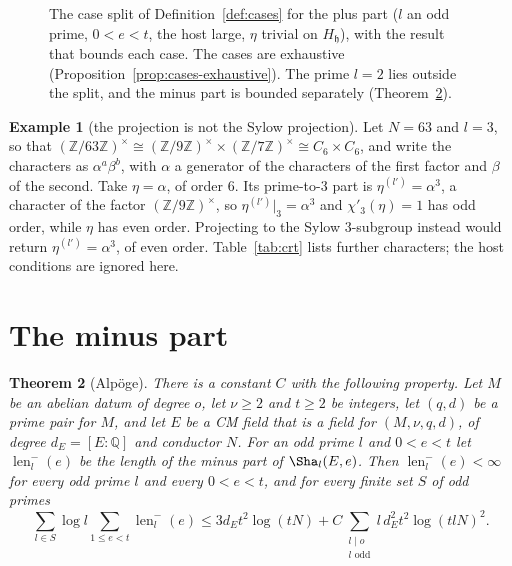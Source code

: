 \documentclass[11pt]{amsbook}
\theoremstyle{plain}
\newtheorem{theorem}{Theorem}[section]
\theoremstyle{definition}
\newtheorem{example}[theorem]{Example}
\theoremstyle{remark}
\numberwithin{equation}{section}
\numberwithin{figure}{chapter}
\numberwithin{table}{chapter}
\newcommand{\Q}{\mathbb{Q}}
\newcommand{\Z}{\mathbb{Z}}
\newcommand{\shalen}{\operatorname{len}}
\begin{document}
\begin{figure}[htbp]
\centering

\caption{The case split of Definition~\ref{def:cases} for the plus part
($l$ an odd prime, $0<e<t$, the host large, $\eta$ trivial on $H_{\mathfrak
h}$),
with the result that bounds each case. The cases are exhaustive
(Proposition~\ref{prop:cases-exhaustive}). The prime $l=2$ lies
outside the split, and the minus part is bounded separately
(Theorem~\ref{thm:minus}).}
\label{fig:cases}
\end{figure}

\begin{example}[the projection is not the Sylow projection]
\label{ex:crt}
Let $N=63$ and $l=3$, so that
$(\Z/63\Z)^\times\cong(\Z/9\Z)^\times\times(\Z/7\Z)^\times\cong
C_6\times C_6$, and write the characters as $\alpha^a\beta^b$, with
$\alpha$ a generator of the characters of the first factor and $\beta$
of the second. Take $\eta=\alpha$, of order $6$. Its prime-to-$3$ part
is $\eta^{(l')}=\alpha^3$, a character of the factor $(\Z/9\Z)^\times$,
so $\eta^{(l')}|_3=\alpha^3$ and $\chi'_3(\eta)=1$ has odd order, while
$\eta$ has even order. Projecting to the Sylow $3$-subgroup instead
would return $\eta^{(l')}=\alpha^3$, of even order. Table~\ref{tab:crt}
lists further characters; the host conditions are ignored here.
\end{example}

\begin{table}[htbp]
\centering

\caption{For $N=63$ and $l=3$:
$(\Z/63)^\times\cong(\Z/9)^\times\times(\Z/7)^\times\cong C_6\times
C_6$, with characters $\alpha^a\beta^b$. Here $\eta^{(l')}$ is the
prime-to-$3$ part of $\eta$, $\eta^{(l')}|_l$ its composite with the
projection to the factor $(\Z/9)^\times$, and
$\chi'_l(\eta)=\eta^{(l')}(\eta^{(l')}|_l)^{-1}$. In the first row $\eta$
has even order and $\chi'_l(\eta)$ is trivial, so the parity test of
Cases~II and~IV differs from a test on $\eta$. The last two columns
show the result of projecting to the Sylow $3$-subgroup instead, which
returns $\eta^{(l')}$. The example ignores the host conditions.}
\label{tab:crt}
\end{table}

\section{The minus part}

\begin{theorem}[Alp\"oge]\label{thm:minus}
There is a constant $C$ with the following property. Let $M$ be an
abelian datum of degree $o$, let $\nu\ge2$ and $t\ge2$ be integers, let
$(q,d)$ be a prime pair for $M$, and let $E$ be a CM field that is a
field for $(M,\nu,q,d)$, of degree $d_E=[E:\Q]$ and conductor $N$.
For an odd prime $l$ and $0<e<t$ let $\shalen^-_l(e)$ be the length of
the minus part of $\Sha_l(E,e)$. Then $\shalen^-_l(e)<\infty$ for every
odd prime $l$ and every $0<e<t$, and for every finite set $S$ of odd
primes
\[
\sum_{l\in S}\log l\sum_{1\le e<t}\shalen_l^-(e)\le
3d_Et^2\log(tN)+C\sum_{\substack{l\mid o\\ l\text{ odd}}}
l\,d_E^2t^2\log(tlN)^2.
\]
\end{theorem}
\end{document}
